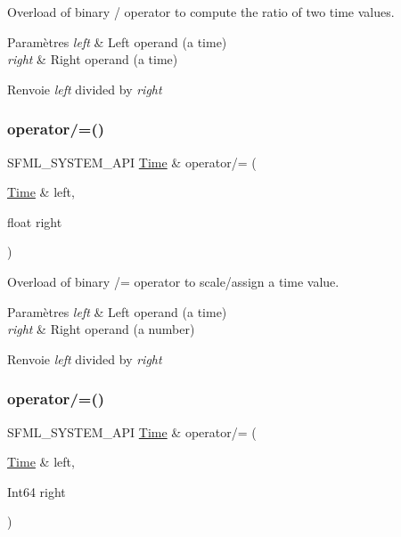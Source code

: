 Overload of binary / operator to compute the ratio of two time values. 


\begin{DoxyParams}{Paramètres}
{\em left} & Left operand (a time) \\
\hline
{\em right} & Right operand (a time)\\
\hline
\end{DoxyParams}
\begin{DoxyReturn}{Renvoie}
{\itshape left} divided by {\itshape right} 
\end{DoxyReturn}
\mbox{\label{classsf_1_1Time_a9835490c54cab06492ec3aa9e9275ef9}} 
\subsubsection{\texorpdfstring{operator/=()}{operator/=()}\hspace{0.1cm}{\footnotesize\ttfamily [1/2]}}
{\footnotesize\ttfamily S\+F\+M\+L\+\_\+\+S\+Y\+S\+T\+E\+M\+\_\+\+A\+PI \hyperlink{classsf_1_1Time}{Time} \& operator/= (\begin{DoxyParamCaption}\item[{\hyperlink{classsf_1_1Time}{Time} \&}]{left,  }\item[{float}]{right }\end{DoxyParamCaption})\hspace{0.3cm}{\ttfamily [related]}}



Overload of binary /= operator to scale/assign a time value. 


\begin{DoxyParams}{Paramètres}
{\em left} & Left operand (a time) \\
\hline
{\em right} & Right operand (a number)\\
\hline
\end{DoxyParams}
\begin{DoxyReturn}{Renvoie}
{\itshape left} divided by {\itshape right} 
\end{DoxyReturn}
\mbox{\label{classsf_1_1Time_ad51871e3db77def834ae8688e64504ff}} 
\subsubsection{\texorpdfstring{operator/=()}{operator/=()}\hspace{0.1cm}{\footnotesize\ttfamily [2/2]}}
{\footnotesize\ttfamily S\+F\+M\+L\+\_\+\+S\+Y\+S\+T\+E\+M\+\_\+\+A\+PI \hyperlink{classsf_1_1Time}{Time} \& operator/= (\begin{DoxyParamCaption}\item[{\hyperlink{classsf_1_1Time}{Time} \&}]{left,  }\item[{Int64}]{right }\end{DoxyParamCaption})\hspace{0.3cm}{\ttfamily [related]}}



